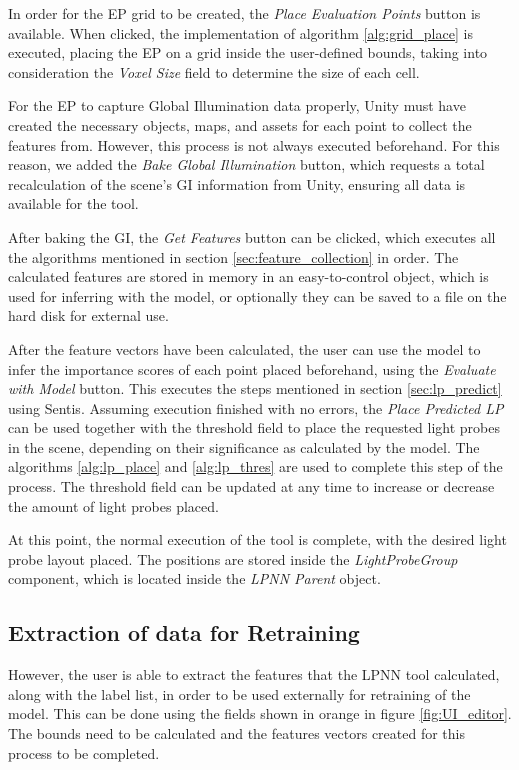 In order for the EP grid to be created, the \textit{Place Evaluation Points} button is available. When clicked, the implementation of algorithm \ref{alg:grid_place} is executed, placing the EP on a grid inside the user-defined bounds, taking into consideration the \textit{Voxel Size} field to determine the size of each cell.\newline

For the EP to capture Global Illumination data properly, Unity must have created the necessary objects, maps, and assets for each point to collect the features from. However, this process is not always executed beforehand. For this reason, we added the \textit{Bake Global Illumination} button, which requests a total recalculation of the scene's GI information from Unity, ensuring all data is available for the tool.

After baking the GI, the \textit{Get Features} button can be clicked, which executes all the algorithms mentioned in section \ref{sec:feature_collection} in order. The calculated features are stored in memory in an easy-to-control object, which is used for inferring with the model, or optionally they can be saved to a file on the hard disk for external use.

After the feature vectors have been calculated, the user can use the model to infer the importance scores of each point placed beforehand, using the \textit{Evaluate with Model} button. This executes the steps mentioned in section \ref{sec:lp_predict} using Sentis. Assuming execution finished with no errors, the \textit{Place Predicted LP} can be used together with the threshold field to place the requested light probes in the scene, depending on their significance as calculated by the model. The algorithms \ref{alg:lp_place} and \ref{alg:lp_thres} are used to complete this step of the process. The threshold field can be updated at any time to increase or decrease the amount of light probes placed.\newline

At this point, the normal execution of the tool is complete, with the desired light probe layout placed. The positions are stored inside the \textit{LightProbeGroup} component, which is located inside the \textit{LPNN Parent} object. 

\subsection{Extraction of data for Retraining}
However, the user is able to extract the features that the LPNN tool calculated, along with the label list, in order to be used externally for retraining of the model. This can be done using the fields shown in orange in figure \ref{fig:UI_editor}. The bounds need to be calculated and the features vectors created for this process to be completed. 

